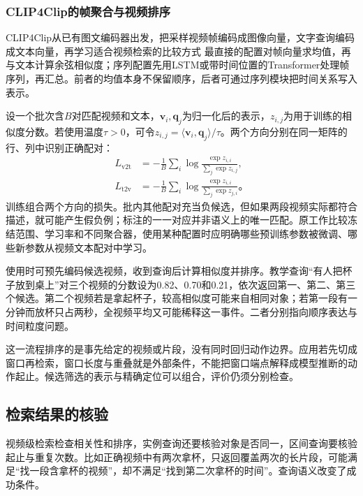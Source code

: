 \subsubsection{CLIP4Clip的帧聚合与视频排序}
\label{sec:vision-video-clip4clip}

CLIP4Clip从已有图文编码器出发，把采样视频帧编码成图像向量，文字查询编码成文本向量，再学习适合视频检索的比较方式 最直接的配置对帧向量求均值，再与文本计算余弦相似度；序列配置先用LSTM或带时间位置的Transformer处理帧序列，再汇总。前者的均值本身不保留顺序，后者可通过序列模块把时间关系写入表示。

设一个批次含$B$对匹配视频和文本，$\bm{v}_i,\bm{q}_j$为归一化后的表示，$z_{i,j}$为用于训练的相似度分数。若使用温度$\tau>0$，可令$z_{i,j}=\langle\bm{v}_i,\bm{q}_j\rangle/\tau$。两个方向分别在同一矩阵的行、列中识别正确配对：
\begin{equation}
  \begin{aligned}
    L_{\mathrm{v2t}}&=-\frac{1}{B}\sum_i
      \log\frac{\exp z_{i,i}}{\sum_j\exp z_{i,j}},\\
    L_{\mathrm{t2v}}&=-\frac{1}{B}\sum_i
      \log\frac{\exp z_{i,i}}{\sum_j\exp z_{j,i}}\text{。}
  \end{aligned}
  \label{eq:vision-video-retrieval-loss}
\end{equation}
训练组合两个方向的损失。批内其他配对充当负候选，但如果两段视频实际都符合描述，就可能产生假负例；标注的一一对应并非语义上的唯一匹配。原工作比较冻结范围、学习率和不同聚合器，使用某种配置时应明确哪些预训练参数被微调、哪些新参数从视频文本配对中学习。

使用时可预先编码候选视频，收到查询后计算相似度并排序。教学查询“有人把杯子放到桌上”对三个视频的分数设为0.82、0.70和0.21，依次返回第一、第二、第三个候选。第二个视频若是拿起杯子，较高相似度可能来自相同对象；若第一段有一分钟而放杯只占两秒，全视频平均又可能稀释这一事件。二者分别指向顺序表达与时间粒度问题。

这一流程排序的是事先给定的视频或片段，没有同时回归动作边界。应用若先切成窗口再检索，窗口长度与重叠就是外部条件，不能把窗口端点解释成模型推断的动作起止。候选筛选的表示与精确定位可以组合，评价仍须分别检查。

\subsection{检索结果的核验}
\label{sec:vision-video-retrieval-check}

视频级检索检查相关性和排序，实例查询还要核验对象是否同一，区间查询要核验起止与重复次数。比如正确视频中有两次拿杯，只返回覆盖两次的长片段，可能满足“找一段含拿杯的视频”，却不满足“找到第二次拿杯的时间”。查询语义改变了成功条件。

